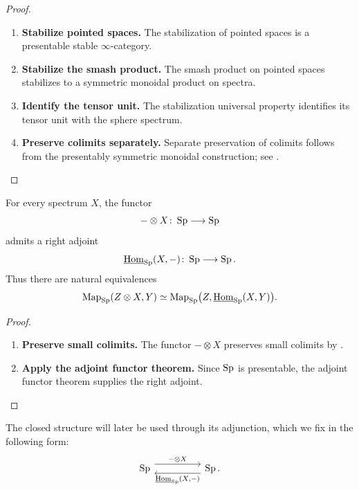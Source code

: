 \begin{proof}
\leavevmode
\begin{enumerate}[label=\textup{(\arabic*)}]
    \item \textbf{Stabilize pointed spaces.}
    The stabilization of pointed spaces is a presentable stable
    $\infty$-category.

    \item \textbf{Stabilize the smash product.}
    The smash product on pointed spaces stabilizes to a
    symmetric monoidal product on spectra.

    \item \textbf{Identify the tensor unit.}
    The stabilization universal property identifies its tensor unit with the sphere spectrum.

    \item \textbf{Preserve colimits separately.}
    Separate preservation of colimits follows from the presentably symmetric monoidal
    construction; see \cite{LurieHigherAlgebra}.
\end{enumerate}
\end{proof}

\begin{proposition}
\label{prop:spectra-closedness}
For every spectrum $X$, the functor
\[
    -\otimes X
    \colon
    \operatorname{Sp}
    \longrightarrow
    \operatorname{Sp}
\]
admits a right adjoint
\[
    \underline{\operatorname{Hom}}_{\operatorname{Sp}}(X,-)
    \colon
    \operatorname{Sp}
    \longrightarrow
    \operatorname{Sp}.
\]
Thus there are natural equivalences
\[
    \operatorname{Map}_{\operatorname{Sp}}(Z\otimes X,Y)
    \simeq
    \operatorname{Map}_{\operatorname{Sp}}
    \bigl(
        Z,
        \underline{\operatorname{Hom}}_{\operatorname{Sp}}(X,Y)
    \bigr).
\]
\end{proposition}

\begin{proof}
\leavevmode
\begin{enumerate}[label=\textup{(\arabic*)}]
    \item \textbf{Preserve small colimits.}
    The functor $-\otimes X$ preserves small colimits by
    .

    \item \textbf{Apply the adjoint functor theorem.}
    Since $\operatorname{Sp}$ is presentable, the adjoint functor theorem supplies the right adjoint.
\end{enumerate}
\end{proof}

The closed structure will later be used through its adjunction, which we fix
in the following form:
\[
\begin{tikzcd}[column sep=huge]
    \Sp
        \arrow[r, shift left=1.1ex, "-\otimes X"]
    &
    \Sp
        \arrow[l, swap, shift left=1.1ex, "{\HHom_{\Sp}(X,-)}"'].
\end{tikzcd}
\]

